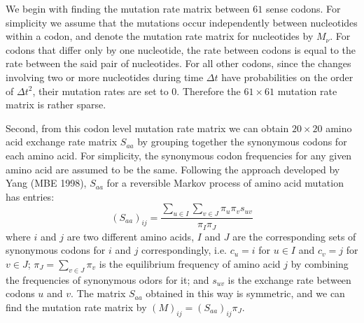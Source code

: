 We begin with finding the mutation rate matrix between $61$ sense codons. 
For simplicity we assume that the mutations occur independently between nucleotides within a codon, and denote the mutation rate matrix for nucleotides by $M_{\nu}$. 
For codons that differ only by one nucleotide, the rate between codons is equal to the rate between the said pair of nucleotides.
For all other codons, since the changes involving two or more nucleotides during time $\Delta t$ have probabilities on the order of $\Delta t^2$, their mutation rates are set to $0$.
Therefore the $61 \times 61$ mutation rate matrix is rather sparse.


Second, from this codon level mutation rate matrix we can obtain $20 \times 20$ amino acid exchange rate matrix $S_{aa}$ by grouping together the synonymous codons for each amino acid. 
For simplicity, the synonymous codon frequencies for any given amino acid are assumed to be the same. 
Following the approach developed by Yang (MBE 1998), $S_{aa}$ for a reversible Markov process of amino acid mutation has entries:
\[(S_{aa})_{ij} = \frac{\sum_{u \in I} \sum_{v \in J} \pi_u \pi_v s_{uv}}{\pi_I \pi_J}\]
where $i$ and $j$ are two different amino acids, $I$ and $J$ are the corresponding sets of synonymous codons for $i$ and $j$ correspondingly, i.e. $c_u = i$ for $u\in I$ and $c_v = j$ for $v \in J$; $\pi_J = \sum_{v \in J} \pi_v$ is the equilibrium frequency of amino acid $j$ by combining the frequencies of synonymous odors for it; and $s_{uv}$ is the exchange rate between codons $u$ and $v$. 
The matrix $S_{aa}$ obtained in this way is symmetric, and we can find the mutation rate matrix by $(M)_{ij} = (S_{aa})_{ij} \pi_J$.\\

